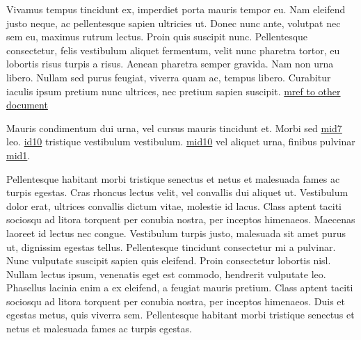 \sphinxAtStartPar
Vivamus tempus tincidunt ex, imperdiet porta mauris tempor eu. Nam eleifend justo neque, ac
pellentesque sapien ultricies ut. Donec nunc ante, volutpat nec sem eu, maximus rutrum lectus. Proin
quis suscipit nunc. Pellentesque consectetur, felis vestibulum aliquet fermentum, velit nunc
pharetra tortor, eu lobortis risus turpis a risus. Aenean pharetra semper gravida. Nam non urna
libero. Nullam sed purus feugiat, viverra quam ac, tempus libero. Curabitur iaculis ipsum pretium
nunc ultrices, nec pretium sapien suscipit. \hyperlink{\detokenize{test_crosspage-mid99-id0}}{\hypertarget{\detokenize{test-mid99-id0}}{mref to other document}}

\sphinxAtStartPar
Mauris condimentum dui urna, vel cursus mauris tincidunt et.
Morbi sed \hyperlink{\detokenize{test-mid7-id1}}{\hypertarget{\detokenize{test-mid7-id0}}{mid7}} leo. \hyperlink{\detokenize{id10}}{id10}
tristique vestibulum vestibulum. \hyperlink{\detokenize{test-mid10-id1}}{\hypertarget{\detokenize{test-mid10-id0}}{mid10}} vel aliquet urna, finibus pulvinar
\hyperlink{\detokenize{test-mid1-id0}}{\hypertarget{\detokenize{test-mid1-id1}}{mid1}}.

\sphinxAtStartPar
Pellentesque habitant morbi tristique senectus et netus et malesuada fames ac turpis egestas. Cras
rhoncus lectus velit, vel convallis dui aliquet ut. Vestibulum dolor erat, ultrices convallis dictum
vitae, molestie id lacus. Class aptent taciti sociosqu ad litora torquent per conubia nostra, per
inceptos himenaeos. Maecenas laoreet id lectus nec congue. Vestibulum turpis justo, malesuada sit
amet purus ut, dignissim egestas tellus. Pellentesque tincidunt consectetur mi a pulvinar. Nunc
vulputate suscipit sapien quis eleifend. Proin consectetur lobortis nisl. Nullam lectus ipsum,
venenatis eget est commodo, hendrerit vulputate leo. Phasellus lacinia enim a ex eleifend, a feugiat
mauris pretium. Class aptent taciti sociosqu ad litora torquent per conubia nostra, per inceptos
himenaeos. Duis et egestas metus, quis viverra sem. Pellentesque habitant morbi tristique senectus
et netus et malesuada fames ac turpis egestas.


